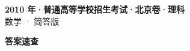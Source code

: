 \documentclass[zihao=-4, a4paper]{ctexart}
\begin{document}
\begin{center}
  {\Large\bfseries 2010 年·普通高等学校招生考试·北京卷·理科}\\[4pt]
  {\large 数学 · 简答版}
\end{center}
\medskip
{}

\clearpage
{}
\begin{center}{\Large\bfseries 答案速查}\end{center}
\medskip

\end{document}
